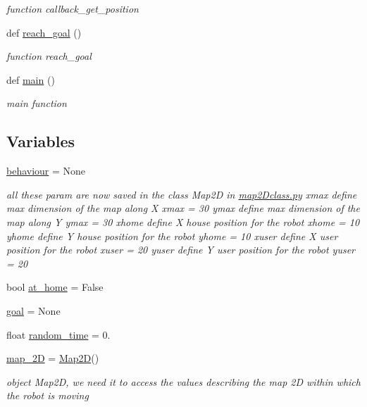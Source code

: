 \begin{DoxyCompactItemize}
\begin{DoxyCompactList}\small\item\em function callback\+\_\+get\+\_\+position \end{DoxyCompactList}\item 
def \hyperlink{namespacemotion_a58accc2356096af3ae30fe9442a1a482}{reach\+\_\+goal} ()
\begin{DoxyCompactList}\small\item\em function reach\+\_\+goal \end{DoxyCompactList}\item 
def \hyperlink{namespacemotion_ad6289fca8572f5af95fd28f4c2dbc68d}{main} ()
\begin{DoxyCompactList}\small\item\em main function \end{DoxyCompactList}\end{DoxyCompactItemize}
\subsection*{Variables}
\begin{DoxyCompactItemize}
\item 
\hyperlink{namespacemotion_a15d63b2a70ac940f179085ce72871c86}{behaviour} = None
\begin{DoxyCompactList}\small\item\em all these param are now saved in the class Map2D in \hyperlink{map2Dclass_8py}{map2\+Dclass.\+py} xmax define max dimension of the map along X xmax = 30 ymax define max dimension of the map along Y ymax = 30 xhome define X house position for the robot xhome = 10 yhome define Y house position for the robot yhome = 10 xuser define X user position for the robot xuser = 20 yuser define Y user position for the robot yuser = 20 \end{DoxyCompactList}\item 
bool \hyperlink{namespacemotion_a30e58643e988d1faddb84cdfd54965f8}{at\+\_\+home} = False
\item 
\hyperlink{namespacemotion_a6427953689c120f9b8a1cb3646733b85}{goal} = None
\item 
float \hyperlink{namespacemotion_a577a5f71c1bdf849f48eed17c4134bee}{random\+\_\+time} = 0.
\item 
\hyperlink{namespacemotion_a858c2a633daaa0a83b599397041f524b}{map\+\_\+2D} = \hyperlink{classmap2Dclass_1_1Map2D}{Map2D}()
\begin{DoxyCompactList}\small\item\em object Map2D, we need it to access the values describing the map 2D within which the robot is moving \end{DoxyCompactList}\end{DoxyCompactItemize}


